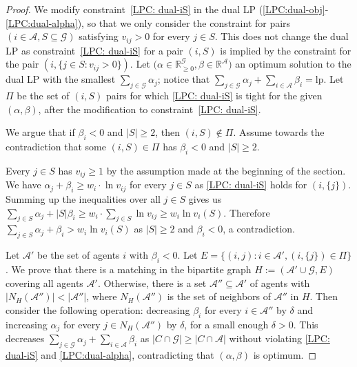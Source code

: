\documentclass{theoretics}
\newcommand\calA{{\mathcal{A}}}
\newcommand\calG{{\mathcal{G}}}
\newcommand{\R}{{\mathbb{R}}}
\newcommand{\lp}{\mathrm{lp}}
\begin{document}
    \begin{proof}
        We modify constraint~\eqref{LPC: dual-iS} in the dual LP  (\ref{LPC:dual-obj}-\ref{LPC:dual-alpha}), so that we only consider the constraint for pairs $(i \in \calA, S \subseteq \calG)$ satisfying $v_{ij} > 0$ for every $j \in S$. This does not change the dual LP as constraint~\eqref{LPC: dual-iS} for a pair $(i, S)$ is implied by the constraint for the pair $(i, \{j \in S: v_{ij}> 0\})$. Let $\big(\alpha \in \R_{\geq 0}^\calG, \beta \in \R^{\calA}\big)$ an optimum solution to the dual LP with the smallest $\sum_{j \in \calG}\alpha_j$; notice that $\sum_{j \in \calG}\alpha_j + \sum_{i \in \calA} \beta_i = \lp$. Let $\Pi$ be the set of $(i, S)$ pairs for which \eqref{LPC: dual-iS} is tight for the given $(\alpha, \beta)$, after the modification to constraint~\eqref{LPC: dual-iS}.
            
        We argue that if $\beta_i < 0$ and $|S| \geq 2$, then $(i, S) \notin \Pi$. Assume towards the contradiction that some $(i, S) \in \Pi$ has $\beta_i < 0$ and $|S| \geq 2$.  
        
        Every $j \in S$ has $v_{ij} \geq 1$ by the assumption made at the beginning of the section.  We have $\alpha_j + \beta_i\geq w_i\cdot \ln v_{ij}$ for every $j \in S$ as \eqref{LPC: dual-iS} holds for $(i, \{j\})$. Summing up the inequalities over all $j \in S$ gives us $\sum_{j \in S}\alpha_j + |S|\beta_i \geq w_i \cdot \sum_{j \in S}\ln v_{ij} \geq w_i \ln v_i(S)$. Therefore $\sum_{j \in S}\alpha_j + \beta_i > w_i \ln v_i(S)$ as $|S|\geq 2$ and $\beta_i < 0$, a contradiction.
    
        Let $\calA'$ be the set of agents $i$ with $\beta_i < 0$. Let $E = \big\{(i, j): i \in \calA', (i, \{j\}) \in \Pi\big\}$. We prove that there is a matching in the bipartite graph $H:= (\calA' \cup \calG, E)$ covering all agents $\calA'$. Otherwise, there is a set $\calA'' \subseteq \calA'$ of agents with $|N_H(\calA'')| < |\calA''|$, where $N_H(\calA'')$ is the set of neighbors of $\calA''$ in $H$. Then consider the following operation: decreasing $\beta_i$ for every $i \in \calA''$ by $\delta$ and increasing $\alpha_j$ for every $j \in N_H(\calA'')$ by $\delta$, for a small enough $\delta > 0$. This decreases $\sum_{j \in \calG}\alpha_j + \sum_{i \in \calA}\beta_i$ as $|C \cap \calG|\geq |C \cap \calA|$ without violating \eqref{LPC: dual-iS} and \eqref{LPC:dual-alpha}, contradicting that $(\alpha, \beta)$ is optimum. 


\end{proof}
\end{document}
